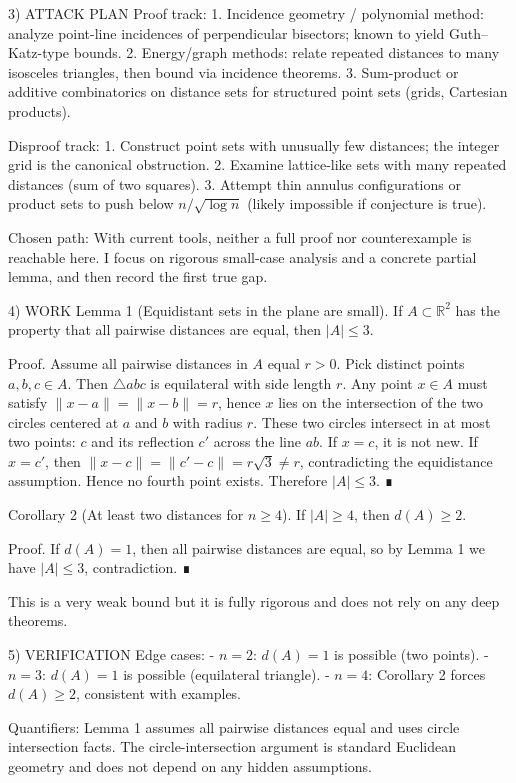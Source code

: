 3) ATTACK PLAN
Proof track:
1. Incidence geometry / polynomial method: analyze point-line incidences of
   perpendicular bisectors; known to yield Guth--Katz-type bounds.
2. Energy/graph methods: relate repeated distances to many isosceles triangles,
   then bound via incidence theorems.
3. Sum-product or additive combinatorics on distance sets for structured point
   sets (grids, Cartesian products).

Disproof track:
1. Construct point sets with unusually few distances; the integer grid is the
   canonical obstruction.
2. Examine lattice-like sets with many repeated distances (sum of two squares).
3. Attempt thin annulus configurations or product sets to push below
   $n/\sqrt{\log n}$ (likely impossible if conjecture is true).

Chosen path: With current tools, neither a full proof nor counterexample is
reachable here. I focus on rigorous small-case analysis and a concrete partial
lemma, and then record the first true gap.

4) WORK
Lemma 1 (Equidistant sets in the plane are small).
If $A \subset \mathbb{R}^2$ has the property that all pairwise distances are equal,
then $|A|\le 3$.

Proof.
Assume all pairwise distances in $A$ equal $r>0$. Pick distinct points $a,b,c \in A$.
Then $\triangle abc$ is equilateral with side length $r$.
Any point $x \in A$ must satisfy $\|x-a\|=\|x-b\|=r$, hence $x$ lies on the intersection
of the two circles centered at $a$ and $b$ with radius $r$. These two circles intersect
in at most two points: $c$ and its reflection $c'$ across the line $ab$.
If $x=c$, it is not new. If $x=c'$, then $\|x-c\| = \|c'-c\| = r\sqrt{3} \ne r$,
contradicting the equidistance assumption. Hence no fourth point exists.
Therefore $|A| \le 3$. ∎

Corollary 2 (At least two distances for $n\ge 4$).
If $|A|\ge 4$, then $d(A)\ge 2$.

Proof.
If $d(A)=1$, then all pairwise distances are equal, so by Lemma 1 we have
$|A|\le 3$, contradiction. ∎

This is a very weak bound but it is fully rigorous and does not rely on any
deep theorems.

5) VERIFICATION
Edge cases:
- $n=2$: $d(A)=1$ is possible (two points).
- $n=3$: $d(A)=1$ is possible (equilateral triangle).
- $n=4$: Corollary 2 forces $d(A)\ge 2$, consistent with examples.

Quantifiers:
Lemma 1 assumes all pairwise distances equal and uses circle intersection facts.
The circle-intersection argument is standard Euclidean geometry and does not
depend on any hidden assumptions.

